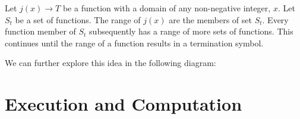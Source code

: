\begin{theorem}
Let $j(x) \longrightarrow T$ be a function with a domain of any non-negative integer, $x$. Let $S_t$ be a set of functions. The range of $j(x)$ are the members of set $S_t$. Every function member of $S_t$ subsequently has a range of more sets of functions. This continues until the range of a function results in a termination symbol. 
\end{theorem}

We can further explore this idea in the following diagram:




\section{Execution and Computation}

\paragraph{  } 